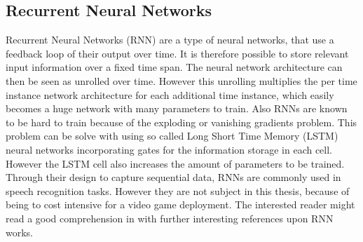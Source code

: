 
\subsection{Recurrent Neural Networks}\label{sec:prev_nn_rnn}
Recurrent Neural Networks (RNN) are a type of neural networks, that use a feedback loop of their output over time.
It is therefore possible to store relevant input information over a fixed time span.
The neural network architecture can then be seen as unrolled over time.
However this unrolling multiplies the per time instance network architecture for each additional time instance,
which easily becomes a huge network with many parameters to train.
Also RNNs are known to be hard to train because of the exploding or vanishing gradients problem.
This problem can be solve with using so called Long Short Time Memory (LSTM) neural networks incorporating gates for the information storage in each cell. However the LSTM cell also increases the amount of parameters to be trained.
Through their design to capture sequential data, RNNs are commonly used in speech recognition tasks.
However they are not subject in this thesis, because of being to cost intensive for a video game deployment.
The interested reader might read a good comprehension in \cite{Staudenmeyer2019} with further interesting references upon RNN works.

